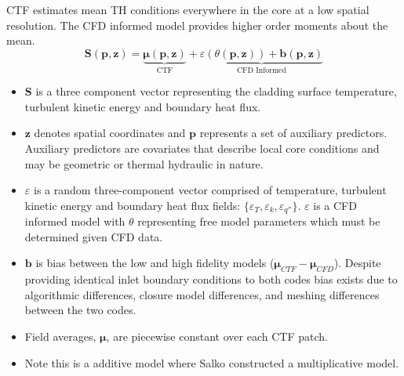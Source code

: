 CTF estimates mean TH conditions everywhere in the core at a low spatial resolution.  The CFD informed model provides higher order moments about the mean.
\begin{equation}
   \mathbf S(\mathbf p, \mathbf z) = \underbrace{ \bm \mu(\mathbf p, \mathbf{z})}_\text{CTF} +
   \underbrace{\varepsilon({\theta (\bm p, \mathbf z)}) + \bm b(\mathbf p, \mathbf{z})}_\text{CFD Informed}
   \label{eq:hi2lo_overview}
\end{equation}

\begin{itemize}
        \item $\mathbf S$ is a three component vector representing the cladding surface temperature, turbulent kinetic energy and boundary heat flux.
        \item $\mathbf z$ denotes spatial coordinates and $\mathbf p$ represents a set of auxiliary predictors.  Auxiliary predictors are covariates that describe local core conditions and may be geometric or thermal hydraulic in nature.
        \item $\varepsilon$ is a random three-component vector comprised of temperature, turbulent kinetic energy and boundary heat flux fields: $\{\varepsilon_T, \varepsilon_k, \varepsilon_{q''}\}$.  $\varepsilon$ is a CFD informed model with $\theta$ representing free model parameters which must be determined given CFD data.
        \item $\bm b$ is bias between the low and high fidelity models ($\bm \mu_{CTF} - \bm \mu_{CFD}$).  Despite providing identical inlet boundary conditions to both codes bias exists due to algorithmic differences, closure model differences, and meshing differences between the two codes.
        \item Field averages, $\bm \mu$, are piecewise constant over each CTF patch.
        \item Note this is a additive model where Salko constructed a multiplicative model.
\end{itemize}

